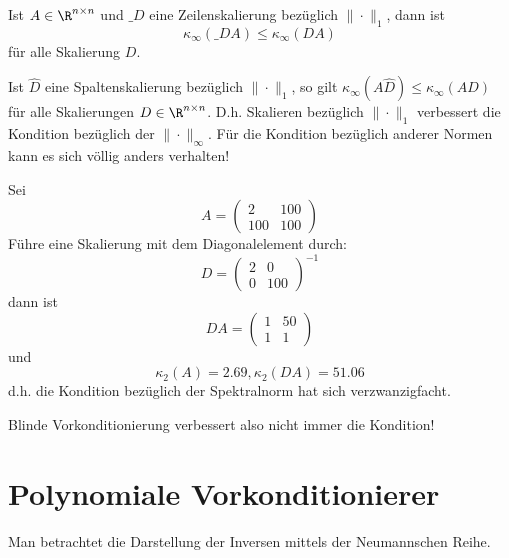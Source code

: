 \documentclass{mycourse}
\begin{document}
\begin{lem}
	\label{lem:6.2}
	Ist $A\in \R^{n\times n}$ und $\_D$ eine Zeilenskalierung bezüglich $\|\cdot\|_1$, dann ist
	\[
		\kappa_\infty(\_D A) \le \kappa_\infty (DA)
	\]
	für alle Skalierung $D$.
	\begin{note}
		Ist $\hat D$ eine Spaltenskalierung bezüglich $\|\cdot\|_1$, so gilt $\kappa_\infty (A\hat D) \le \kappa_\infty(AD)$ für alle Skalierungen $D\in \R^{n\times n}$.
		D.h. Skalieren bezüglich $\|\cdot\|_1$ verbessert die Kondition bezüglich der $\|\cdot\|_\infty$.
		Für die Kondition bezüglich anderer Normen kann es sich völlig anders verhalten!
	\end{note}
\end{lem}

\begin{ex}
	\label{ex:6.3}
	Sei
	\[
		A = \begin{pmatrix}2&100\\100&100\end{pmatrix}
	\]
	Führe eine Skalierung mit dem Diagonalelement durch:
	\[
		D =\begin{pmatrix}2&0\\0&100\end{pmatrix}^{-1}
	\]
	dann ist
	\[
		DA = \begin{pmatrix}1&50\\1&1\end{pmatrix}
	\]
	und
	\[
		\kappa_2(A) = 2.69, \kappa_2(DA) = 51.06
	\]
	d.h. die Kondition bezüglich der Spektralnorm hat sich verzwanzigfacht.

	Blinde Vorkonditionierung verbessert also nicht immer die Kondition!
\end{ex}


\section{Polynomiale Vorkonditionierer}


Man betrachtet die Darstellung der Inversen mittels der Neumannschen Reihe.
\end{document}
